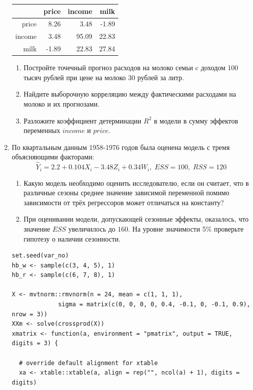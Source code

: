 \documentclass[12pt, a4paper]{article}
\begin{document}
\begin{enumerate}
\begin{tabular}{rrrr}
  \hline
 & price & income & milk \\
  \hline
price & 8.26 & 3.48 & -1.89 \\
  income & 3.48 & 95.09 & 22.83 \\
  milk & -1.89 & 22.83 & 27.84 \\
   \hline
\end{tabular}



\begin{enumerate}
\item Постройте точечный прогноз расходов на молоко семьи c доходом 100 тысяч рублей при цене на молоко 30 рублей за литр.
\item Найдите выборочную корреляцию между фактическими расходами на молоко и их прогнозами.
\item Разложите коэффициент детерминации $R^2$ в модели в сумму эффектов переменных $income$ и $price$.
\end{enumerate}


\item По квартальным данным 1958-1976 годов была оценена модель с тремя объясняющими факторами:
\[
\hat Y_i = 2.2 + 0.104 X_i - 3.48 Z_i + 0.34 W_i, \; ESS = 100, \; RSS = 120
\]

\begin{enumerate}
\item Какую модель необходимо оценить исследователю, если он считает, что в различные сезоны среднее значение зависимой переменной помимо зависимости от трёх регрессоров может отличаться на константу?
\item При оценивании модели, допускающей сезонные эффекты, оказалось, что значение $ESS$ увеличилось до $160$.
На уровне значимости 5\% проверьте гипотезу о наличии сезонности.
\end{enumerate}

\begin{verbatim}
set.seed(var_no)
hb_w <- sample(c(3, 4, 5), 1)
hb_r <- sample(c(6, 7, 8), 1)

X <- mvtnorm::rmvnorm(n = 24, mean = c(1, 1, 1),
             sigma = matrix(c(0, 0, 0, 0, 0.4, -0.1, 0, -0.1, 0.9), nrow = 3))
XXm <- solve(crossprod(X))
xmatrix <- function(a, environment = "pmatrix", output = TRUE, digits = 3) {

  # override default alignment for xtable
  xa <- xtable::xtable(a, align = rep("", ncol(a) + 1), digits = digits)


\end{verbatim}
\end{enumerate}
\end{document}

